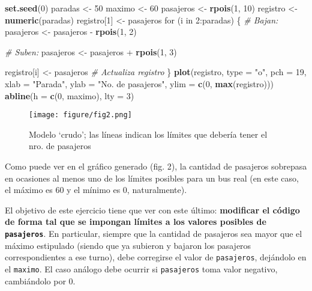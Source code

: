 \documentclass[]{article}
\makeatletter
\newenvironment{Shaded}{}{}
\newcommand{\KeywordTok}[1]{\textcolor[rgb]{0.00,0.44,0.13}{\textbf{{#1}}}}
\newcommand{\DataTypeTok}[1]{\textcolor[rgb]{0.56,0.13,0.00}{{#1}}}
\newcommand{\DecValTok}[1]{\textcolor[rgb]{0.25,0.63,0.44}{{#1}}}
\newcommand{\StringTok}[1]{\textcolor[rgb]{0.25,0.44,0.63}{{#1}}}
\newcommand{\CommentTok}[1]{\textcolor[rgb]{0.38,0.63,0.69}{\textit{{#1}}}}
\newcommand{\NormalTok}[1]{{#1}}
\def\maxwidth{\ifdim\Gin@nat@width>\linewidth\linewidth
\else\Gin@nat@width\fi}
\let\Oldincludegraphics\includegraphics
\renewcommand{\includegraphics}[1]{\Oldincludegraphics[width=\maxwidth]{#1}}
\makeatother
\begin{document}
\begin{Shaded}
\begin{Highlighting}[]
\KeywordTok{set.seed}\NormalTok{(}\DecValTok{0}\NormalTok{)}
\NormalTok{paradas <- }\DecValTok{50}
\NormalTok{maximo <- }\DecValTok{60}
\NormalTok{pasajeros <- }\KeywordTok{rpois}\NormalTok{(}\DecValTok{1}\NormalTok{, }\DecValTok{10}\NormalTok{)}
\NormalTok{registro <- }\KeywordTok{numeric}\NormalTok{(paradas)}
\NormalTok{registro[}\DecValTok{1}\NormalTok{] <- pasajeros}
\NormalTok{for (i in }\DecValTok{2}\NormalTok{:paradas) \{}
    \CommentTok{# Bajan:}
    \NormalTok{pasajeros <- pasajeros - }\KeywordTok{rpois}\NormalTok{(}\DecValTok{1}\NormalTok{, }\DecValTok{2}\NormalTok{)}

    \CommentTok{# Suben:}
    \NormalTok{pasajeros <- pasajeros + }\KeywordTok{rpois}\NormalTok{(}\DecValTok{1}\NormalTok{, }\DecValTok{3}\NormalTok{)}

    \NormalTok{registro[i] <- pasajeros  }\CommentTok{# Actualiza registro}
\NormalTok{\}}
\KeywordTok{plot}\NormalTok{(registro, }\DataTypeTok{type =} \StringTok{"o"}\NormalTok{, }\DataTypeTok{pch =} \DecValTok{19}\NormalTok{, }\DataTypeTok{xlab =} \StringTok{"Parada"}\NormalTok{, }\DataTypeTok{ylab =} \StringTok{"No. de pasajeros"}\NormalTok{, }
    \DataTypeTok{ylim =} \KeywordTok{c}\NormalTok{(}\DecValTok{0}\NormalTok{, }\KeywordTok{max}\NormalTok{(registro)))}
\KeywordTok{abline}\NormalTok{(}\DataTypeTok{h =} \KeywordTok{c}\NormalTok{(}\DecValTok{0}\NormalTok{, maximo), }\DataTypeTok{lty =} \DecValTok{3}\NormalTok{)}
\end{Highlighting}
\end{Shaded}
\begin{figure}[htbp]
\centering
\texttt{[image: figure/fig2.png]}
\caption{Modelo `crudo'; las líneas indican los límites que debería
tener el nro. de pasajeros}
\end{figure}

Como puede ver en el gráfico generado (fig. 2), la cantidad de pasajeros
sobrepasa en ocasiones al menos uno de los límites posibles para un bus
real (en este caso, el máximo es 60 y el mínimo es 0, naturalmente).

El objetivo de este ejercicio tiene que ver con este último:
\textbf{modificar el código de forma tal que se impongan límites a los
valores posibles de \texttt{pasajeros}}. En particular, siempre que la
cantidad de pasajeros sea mayor que el máximo estipulado (siendo que ya
subieron y bajaron los pasajeros correspondientes a ese turno), debe
corregirse el valor de \texttt{pasajeros}, dejándolo en el
\texttt{maximo}. El caso análogo debe ocurrir si \texttt{pasajeros} toma
valor negativo, cambiándolo por 0.
\end{document}
